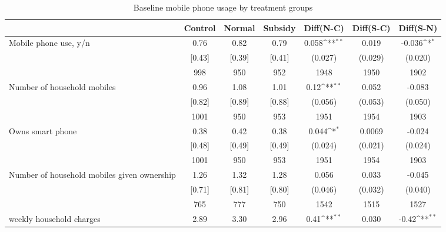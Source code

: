 \begin{table}[htbp]\centering
\def\sym#1{\ifmmode^{#1}\else\(^{#1}\)\fi}
\caption{Baseline mobile phone usage by treatment groups \label{tab:"balance"}}
\begin{tabular*}{1\hsize}{@{\hskip\tabcolsep\extracolsep\fill}l*{1}{cccccc}}
\toprule
                                &  Control&   Normal&  Subsidy&Diff(N-C)         &Diff(S-C)         &Diff(S-N)         \\
\midrule
Mobile phone use, y/n           &     0.76&     0.82&     0.79&    0.058\sym{**} &    0.019         &   -0.036\sym{*}  \\
                                &   [0.43]&   [0.39]&   [0.41]&  (0.027)         &  (0.029)         &  (0.020)         \\
                                &      998&      950&      952&     1948         &     1950         &     1902         \\
Number of household mobiles     &     0.96&     1.08&     1.01&     0.12\sym{**} &    0.052         &   -0.083         \\
                                &   [0.82]&   [0.89]&   [0.88]&  (0.056)         &  (0.053)         &  (0.050)         \\
                                &     1001&      950&      953&     1951         &     1954         &     1903         \\
Owns smart phone                &     0.38&     0.42&     0.38&    0.044\sym{*}  &   0.0069         &   -0.024         \\
                                &   [0.48]&   [0.49]&   [0.49]&  (0.024)         &  (0.021)         &  (0.024)         \\
                                &     1001&      950&      953&     1951         &     1954         &     1903         \\
Number of household mobiles given ownership&     1.26&     1.32&     1.28&    0.056         &    0.033         &   -0.045         \\
                                &   [0.71]&   [0.81]&   [0.80]&  (0.046)         &  (0.032)         &  (0.040)         \\
                                &      765&      777&      750&     1542         &     1515         &     1527         \\
weekly household charges        &     2.89&     3.30&     2.96&     0.41\sym{**} &    0.030         &    -0.42\sym{**} \\

\end{tabular*}
\end{table}
